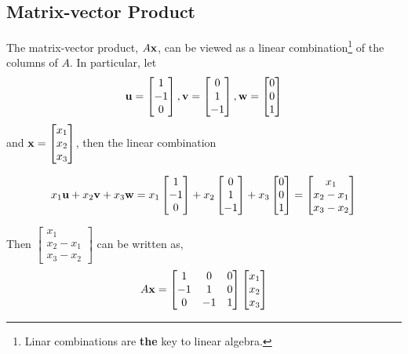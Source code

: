 \subsection*{Matrix-vector Product}
The matrix-vector product, $A{\bf x}$, can be viewed as a linear combination\footnote{Linar combinations are \textbf{the} key to linear algebra.} of the columns of $A$.  In particular, let 
\[  {\bf u} = \begin{bmatrix}  1 \\-1 \\0 \end{bmatrix}, {\bf v} = \begin{bmatrix} 0 \\ 1 \\ -1 \end{bmatrix}, {\bf w} = \begin{bmatrix} 0 \\ 0 \\ 1  \end{bmatrix}
\]
and ${\bf x}=\begin{bmatrix}  x_1 \\x_2 \\x_3 \end{bmatrix}$, then the linear combination

\[  x_1 {\bf u} + x_2 {\bf v} + x_3 {\bf w} = x_1 \begin{bmatrix}  1 \\-1 \\0 \end{bmatrix} + x_2\begin{bmatrix} 0 \\ 1 \\ -1 \end{bmatrix} + x_3 \begin{bmatrix} 0 \\ 0 \\ 1  \end{bmatrix} = \begin{bmatrix} x_1 \\ x_2 - x_1 \\ x_3 - x_2   \end{bmatrix}
\]

{\bf *}Then $ \begin{bmatrix} x_1 \\ x_2 - x_1 \\ x_3 - x_2   \end{bmatrix}$ can be written as, 
\[ A{\bf x}  = \begin{bmatrix}  1 & 0 & 0 \\-1 & 1 & 0 \\0 & -1 & 1 \end{bmatrix}  \begin{bmatrix}  x_1 \\x_2 \\x_3 \end{bmatrix} \]

